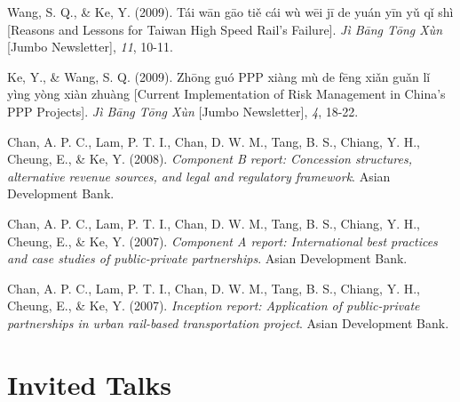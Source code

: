 \documentclass[11pt,a4paper]{report} %
\begin{document}
\begin{tablist}
        \item[2009] \tab{}Wang, S. Q., \& Ke, Y. (2009). Tái wān gāo tiě cái wù wēi jī de yuán yīn yǔ qǐ shì [Reasons and Lessons for Taiwan High Speed Rail's Failure]. \textit{Jì Bāng Tōng Xùn} [Jumbo Newsletter], \textit{11}, 10-11.

        \item[2009] \tab{}Ke, Y., \& Wang, S. Q. (2009). Zhōng guó PPP xiàng mù de fēng xiǎn guǎn lǐ yìng yòng xiàn zhuàng [Current Implementation of Risk Management in China's PPP Projects]. \textit{Jì Bāng Tōng Xùn} [Jumbo Newsletter], \textit{4}, 18-22. 
        
        \item[2008] \tab{}Chan, A. P. C., Lam, P. T. I., Chan, D. W. M., Tang, B. S., Chiang, Y. H., Cheung, E., \& Ke, Y. (2008). \textit{Component B report: Concession structures, alternative revenue sources, and legal and regulatory framework}. Asian Development Bank.
        
        \item[2007] \tab{}Chan, A. P. C., Lam, P. T. I., Chan, D. W. M., Tang, B. S., Chiang, Y. H., Cheung, E., \& Ke, Y. (2007). \textit{Component A report: International best practices and case studies of public-private partnerships}. Asian Development Bank.
        
        \item[2007] \tab{}Chan, A. P. C., Lam, P. T. I., Chan, D. W. M., Tang, B. S., Chiang, Y. H., Cheung, E., \& Ke, Y. (2007). \textit{Inception report: Application of public-private partnerships in urban rail-based transportation project}. Asian Development Bank.

    \end{tablist}
    

    \section*{Invited Talks}
\end{document}
